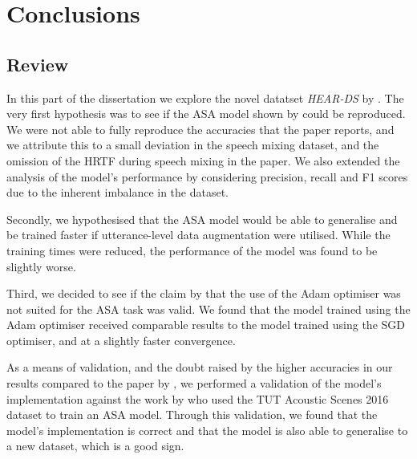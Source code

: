\documentclass[logo,bsc,singlespacing,parskip,online]{infthesis}
\newcommand{\heards}{\textit{HEAR-DS}\xspace}
\begin{document}





\chapter{Conclusions}
\label{chap:conclusions}
\section{Review}
In this part of the dissertation we explore the novel datatset \heards by \citet{Huwel2020HearDS}.
The very first hypothesis was to see if the ASA model shown by \citet{Huwel2020HearDS} 
could be reproduced. We were not able to fully reproduce the accuracies that the paper 
reports, and we attribute this to a small deviation
in the speech mixing dataset, and the omission of 
the HRTF during speech mixing in the paper. We also 
extended the analysis of the model's performance 
by considering precision, recall and F1 scores 
due to the inherent imbalance in the dataset.

Secondly, we hypothesised that the ASA model 
would be able to generalise and be trained 
faster if utterance-level data augmentation were utilised. 
While the training times were reduced, the performance 
of the model was found to be slightly worse. 

Third, we decided to see if the claim by \citet{Huwel2020HearDS} 
that the use of the Adam optimiser was not suited 
for the ASA task was valid. We found that the model 
trained using the Adam optimiser received 
comparable results to the model trained using the 
SGD optimiser, and at a slightly faster convergence.

As a means of validation, and the doubt raised 
by the higher accuracies in our results compared 
to the paper by \citet{Huwel2020HearDS}, we 
performed a validation of the model's implementation
against the work by \citet{schindler_multi-temporal_2018} 
who used the TUT Acoustic Scenes 2016 dataset to 
train an ASA model. Through this validation, we 
found that the model's implementation is correct 
and that the model is also able to generalise to 
a new dataset, which is a good sign.
\end{document}
